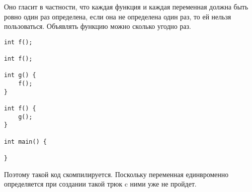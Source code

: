 Оно гласит в частности, что каждая функция и каждая переменная должна быть ровно один раз определена, если она не определена один раз, то ей нельзя пользоваться.
Объявлять функцию можно сколько угодно раз.

\begin{verbatim}
int f();

int f();

int g() {
    f();
}

int f() {
    g();
}

int main() {

}
\end{verbatim}

Поэтому такой код скомпилируется. Поскольку переменная единвроменно определяется при создании такой трюк c ними уже не пройдет.